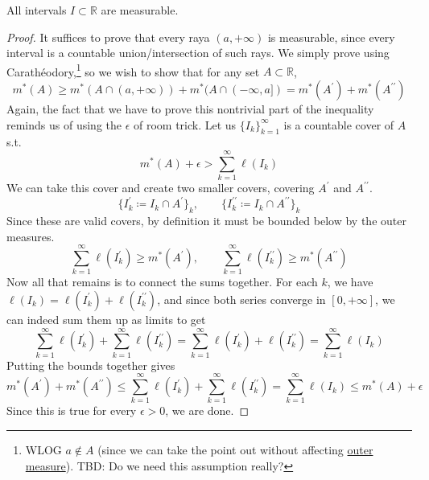   \begin{theorem}
    \label{thm:intervals-are-measurable}
    All intervals $I \subset \mathbb{R}$ are measurable. 
  \end{theorem}
  \begin{proof}
    It suffices to prove that every raya $(a, +\infty)$ is measurable, since every interval is a countable union/intersection of such rays. We simply prove using Carathéodory,\footnote{WLOG $a \not\in A$ (since we can take the point out without affecting \hyperref[def:outer-measure]{outer measure}). TBD: Do we need this assumption really?} so we wish to show that for any set $A \subset \mathbb{R}$, 
    \begin{equation}
      m^\ast (A) \geq m^\ast (A \cap (a, +\infty)) + m^\ast(A \cap (-\infty, a]) = m^\ast (A^\prime) + m^\ast(A^{\prime\prime})
    \end{equation}
    Again, the fact that we have to prove this nontrivial part of the inequality reminds us of using the $\epsilon$ of room trick. Let us 
    $\{I_k\}_{k=1}^\infty$ is a countable cover of $A$ s.t. 
    \begin{equation}
      m^\ast (A) + \epsilon > \sum_{k=1}^\infty \ell (I_k)
    \end{equation}
    We can take this cover and create two smaller covers, covering $A^\prime$ and $A^{\prime\prime}$. 
    \begin{equation}
      \{I_k^\prime \coloneqq I_k \cap A^\prime\}_k, \qquad \{I_k^{\prime\prime} \coloneqq I_k \cap A^{\prime\prime}\}_k
    \end{equation}
    Since these are valid covers, by definition it must be bounded below by the outer measures. 
    \begin{equation}
      \sum_{k=1}^\infty \ell(I_k^\prime) \geq m^\ast(A^\prime), \qquad \sum_{k=1}^\infty \ell(I_k^{\prime\prime}) \geq m^\ast(A^{\prime\prime})
    \end{equation}
    Now all that remains is to connect the sums together. For each $k$, we have $\ell(I_k) = \ell(I_k^\prime) + \ell(I_k^{\prime\prime})$, and since both series converge in $[0, +\infty]$, we can indeed sum them up as limits to get 
    \begin{equation}
      \sum_{k=1}^\infty \ell(I_k^\prime) + \sum_{k=1}^\infty \ell(I_k^{\prime\prime}) = \sum_{k=1}^\infty \ell(I_k^\prime) + \ell(I_k^{\prime\prime}) = \sum_{k=1}^\infty \ell(I_k) 
    \end{equation}
    Putting the bounds together gives 
    \begin{equation}
      m^\ast (A^\prime) + m^\ast (A^{\prime\prime}) \leq \sum_{k=1}^\infty \ell(I_k^\prime) + \sum_{k=1}^\infty \ell(I_k^{\prime\prime}) = \sum_{k=1}^\infty \ell(I_k)  \leq m^\ast (A) + \epsilon
    \end{equation}
    Since this is true for every $\epsilon > 0$, we are done.  
  \end{proof}

